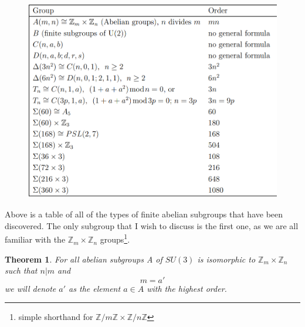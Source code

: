 \documentclass[12pt]{article}
\newcommand{\Z}{\mathbb{Z}}
\newtheorem{thm}{Theorem}[section]
\begin{document}
\begin{figure}[h!]
	\includegraphics[scale=0.4]{img.png}
\end{figure}
Above is a table of all of the types of finite abelian subgroups that have been discovered. The only subgroup that I wish to discuss is the first one, as we are all familiar with the $\Z_m \times \Z_n$ groups\footnote{simple shorthand for $\Z/m\Z \times \Z/n\Z$}.
\begin{thm}
For all abelian subgroups A of $SU(3)$ is isomorphic to $\Z_m \times \Z_n$ such that $n|m$ and
\[ m = a' \]
we will denote $a'$ as the element $a \in A$ with the highest order.
\end{thm}
\end{document}
